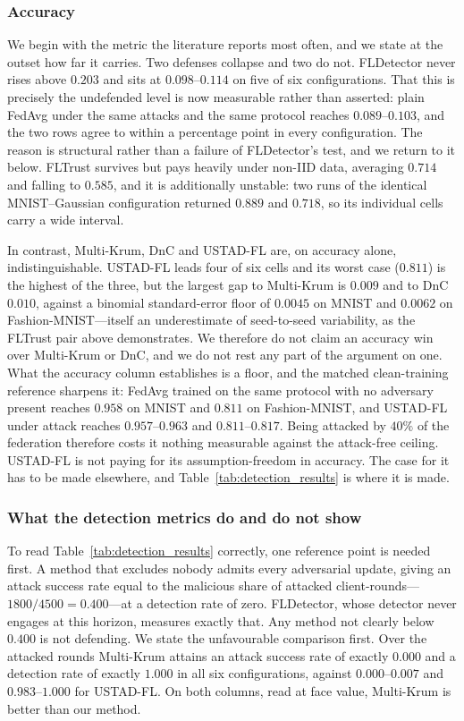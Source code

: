 \documentclass[journal]{IEEEtran}
\begin{document}
\subsubsection{Accuracy}
We begin with the metric the literature reports most often, and we state at the outset how far
it carries. Two defenses collapse and two do not. FLDetector never rises above $0.203$ and sits at
$0.098$--$0.114$ on five of six configurations. That this is precisely the undefended level
is now measurable rather than asserted: plain FedAvg under the same attacks and the same
protocol reaches $0.089$--$0.103$, and the two rows agree to within a percentage point in
every configuration. The reason is structural rather than a failure of FLDetector's test,
and we return to it below. FLTrust
survives but pays heavily under non-IID data, averaging $0.714$ and falling to $0.585$, and
it is additionally unstable: two runs of the identical MNIST--Gaussian configuration
returned $0.889$ and $0.718$, so its individual cells carry a wide interval.

In contrast, Multi-Krum, DnC and USTAD-FL are, on accuracy alone, indistinguishable. USTAD-FL leads four
of six cells and its worst case ($0.811$) is the highest of the three, but the largest gap
to Multi-Krum is $0.009$ and to DnC $0.010$, against a binomial standard-error floor of
$0.0045$ on MNIST and $0.0062$ on Fashion-MNIST---itself an underestimate of seed-to-seed
variability, as the FLTrust pair above demonstrates. We therefore do not claim an accuracy
win over Multi-Krum or DnC, and we do not rest any part of the argument on one. What the
accuracy column establishes is a floor, and the matched clean-training reference sharpens it:
FedAvg trained on the same protocol with no adversary present reaches $0.958$ on MNIST and
$0.811$ on Fashion-MNIST, and USTAD-FL under attack reaches $0.957$--$0.963$ and
$0.811$--$0.817$. Being attacked by $40\%$ of the federation therefore costs it nothing
measurable against the attack-free ceiling. USTAD-FL is not paying for its assumption-freedom
in accuracy. The case for it has to be made elsewhere, and Table~\ref{tab:detection_results} is
where it is made.

\subsubsection{What the detection metrics do and do not show}
To read Table~\ref{tab:detection_results} correctly, one reference point is needed first. A method that excludes nobody admits every adversarial update, giving an attack success rate equal to the malicious share of attacked client-rounds---$1800/4500 = 0.400$---at a detection rate of zero. FLDetector, whose detector never engages at this horizon, measures exactly that. Any method not clearly below $0.400$ is not defending. We state the unfavourable comparison first. Over the attacked rounds Multi-Krum attains an
attack success rate of exactly $0.000$ and a detection rate of exactly $1.000$ in all six
configurations, against $0.000$--$0.007$ and $0.983$--$1.000$ for USTAD-FL. On both columns,
read at face value, Multi-Krum is better than our method.
\end{document}
